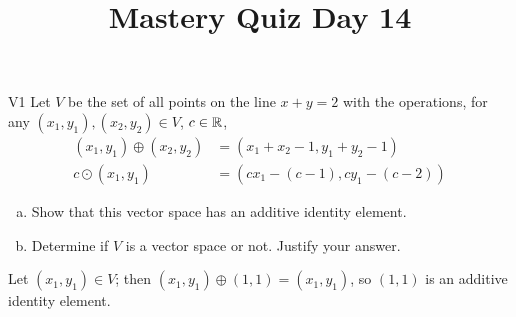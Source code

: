 \documentclass{sbgLAquiz}
\title{Mastery Quiz Day 14 }
\begin{document}
\begin{problem}{V1}
Let $V$ be the set of all points on the line $x+y=2$ with the operations, for any $(x_1,y_1), (x_2,y_2) \in V$, $c \in \mathbb{R}$,
\begin{align*}
(x_1,y_1) \oplus (x_2,y_2) &= (x_1+x_2-1,y_1+y_2-1) \\
c \odot (x_1,y_1) &= (cx_1-(c-1), cy_1-(c-2))
\end{align*}
\begin{enumerate}[(a)]
\item Show that this vector space has an additive identity element.
\item Determine if $V$ is a vector space or not.  Justify your answer.
\end{enumerate}
\end{problem}
\begin{solution}
Let $(x_1,y_1) \in V$; then $(x_1,y_1) \oplus (1,1) = (x_1,y_1)$, so $(1,1)$ is an additive identity element.


\end{solution}
\end{document}
